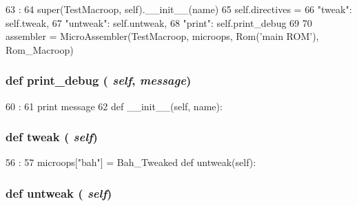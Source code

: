 \begin{DoxyCode}
63                             :
64         super(TestMacroop, self).__init__(name)
65         self.directives = {
66             "tweak": self.tweak,
67             "untweak": self.untweak,
68             "print": self.print_debug
69         }
70 
assembler = MicroAssembler(TestMacroop, microops, Rom('main ROM'), Rom_Macroop)
\end{DoxyCode}
\hypertarget{classmicro__asm__test_1_1TestMacroop_a21b9cd12cd06f03543452bb453dcd0dd}{
\subsubsection[{print\_\-debug}]{\setlength{\rightskip}{0pt plus 5cm}def print\_\-debug ( {\em self}, \/   {\em message})}}
\label{classmicro__asm__test_1_1TestMacroop_a21b9cd12cd06f03543452bb453dcd0dd}



\begin{DoxyCode}
60                                   :
61         print message
62 
    def __init__(self, name):
\end{DoxyCode}
\hypertarget{classmicro__asm__test_1_1TestMacroop_a65da197345d4ff5f07a39c9f12d92ad9}{
\subsubsection[{tweak}]{\setlength{\rightskip}{0pt plus 5cm}def tweak ( {\em self})}}
\label{classmicro__asm__test_1_1TestMacroop_a65da197345d4ff5f07a39c9f12d92ad9}



\begin{DoxyCode}
56                    :
57         microops["bah"] = Bah_Tweaked
    def untweak(self):
\end{DoxyCode}
\hypertarget{classmicro__asm__test_1_1TestMacroop_a5098685e7817bc3cae439b2f554c6f09}{
\subsubsection[{untweak}]{\setlength{\rightskip}{0pt plus 5cm}def untweak ( {\em self})}}
\label{classmicro__asm__test_1_1TestMacroop_a5098685e7817bc3cae439b2f554c6f09}



